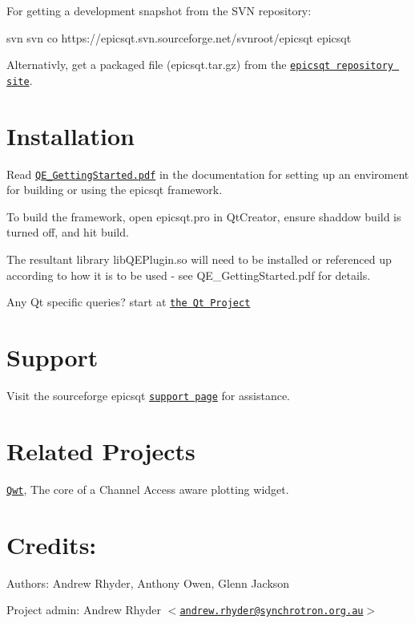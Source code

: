 For getting a development snapshot from the SVN repository: 
\begin{DoxyCode}
 svn svn co https://epicsqt.svn.sourceforge.net/svnroot/epicsqt epicsqt
\end{DoxyCode}


Alternativly, get a packaged file (epicsqt.tar.gz) from the \href{http://epicsqt.svn.sourceforge.net/viewvc/epicsqt/?view=tar}{\tt epicsqt repository site}.\hypertarget{index_installonmainpage}{}\section{Installation}\label{index_installonmainpage}
Read \href{http://sourceforge.net/projects/epicsqt/files/documentation/QE_GettingStarted.pdf/download}{\tt QE\_\-GettingStarted.pdf} in the documentation for setting up an enviroment for building or using the epicsqt framework.\par
 To build the framework, open epicsqt.pro in QtCreator, ensure shaddow build is turned off, and hit build.\par
 The resultant library libQEPlugin.so will need to be installed or referenced up according to how it is to be used -\/ see QE\_\-GettingStarted.pdf for details.\par
 Any Qt specific queries? start at \href{http://qt-project.org}{\tt the Qt Project}\hypertarget{index_support}{}\section{Support}\label{index_support}
Visit the sourceforge epicsqt \href{http://sourceforge.net/projects/epicsqt/support}{\tt support page} for assistance.\hypertarget{index_relatedprojects}{}\section{Related Projects}\label{index_relatedprojects}
\href{http://qwt.sourceforge.net/}{\tt Qwt}, The core of a Channel Access aware plotting widget.\hypertarget{index_credits}{}\section{Credits:}\label{index_credits}
\begin{DoxyParagraph}{Authors: }
Andrew Rhyder, Anthony Owen, Glenn Jackson 
\end{DoxyParagraph}
\begin{DoxyParagraph}{Project admin:}
Andrew Rhyder $<$\href{mailto:andrew.rhyder@synchrotron.org.au}{\tt andrew.rhyder@synchrotron.org.au}$>$ 
\end{DoxyParagraph}
